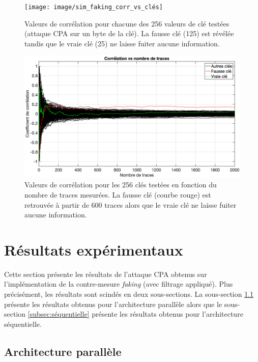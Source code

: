 \documentclass[oneside]{book}
\begin{document}
\begin{figure}[htbp]
    \hspace{-2cm}
    \texttt{[image: image/sim\_faking\_corr\_vs\_clés]}
    \caption{Valeurs de corrélation pour chacune des 256 valeurs de clé testées (attaque CPA sur un byte de la clé). La fausse clé (125) est révélée tandis que le vraie clé (25) ne laisse fuiter aucune information.}
    \label{fig:sim_faking_corr_vs_clés} 
    \hspace{-2cm}
    \includegraphics[scale=0.4]{image/sim_faking_corr_vs_nb_traces}
    \caption{Valeurs de corrélation pour les 256 clés testées en fonction du nombre de traces mesurées. La fausse clé (courbe rouge) est retrouvée à partir de 600 traces alors que le vraie clé ne laisse fuiter aucune information.}
    \label{fig:sim_faking_corr_vs_nb_traces} 
\end{figure}


\newpage

\section{Résultats expérimentaux}
\label{sec:Exp_Results_Faking}

Cette section présente les résultats de l'attaque CPA obtenus sur l'implémentation de la contre-mesure \textit{faking} (avec filtrage appliqué). Plus précisément, les résultats sont scindés en deux sous-sections. La sous-section \ref{subsec:parallèle} présente les résultats obtenus pour l'architecture parallèle alors que le sous-section \ref{subsec:séquentielle} présente les résultats obtenus pour l'architecture séquentielle.

\subsection{Architecture parallèle}
\label{subsec:parallèle}
\end{document}
